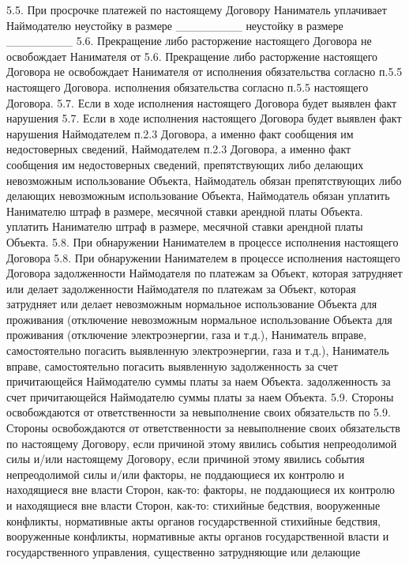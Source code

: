5.5. При просрочке платежей по настоящему Договору Наниматель уплачивает
Наймодателю
неустойку в размере ________%
неустойку в размере ________%
5.6. Прекращение либо расторжение настоящего Договора не освобождает Нанимателя
от
5.6. Прекращение либо расторжение настоящего Договора не освобождает Нанимателя
от
исполнения обязательства согласно п.5.5 настоящего Договора.
исполнения обязательства согласно п.5.5 настоящего Договора.
5.7. Если в ходе исполнения настоящего Договора будет выявлен факт нарушения
5.7. Если в ходе исполнения настоящего Договора будет выявлен факт нарушения
Наймодателем п.2.3 Договора, а именно факт сообщения им недостоверных сведений,
Наймодателем п.2.3 Договора, а именно факт сообщения им недостоверных сведений,
препятствующих либо делающих невозможным использование Объекта, Наймодатель
обязан
препятствующих либо делающих невозможным использование Объекта, Наймодатель
обязан
уплатить Нанимателю штраф в размере, месячной ставки арендной платы Объекта.
уплатить Нанимателю штраф в размере, месячной ставки арендной платы Объекта.
5.8. При обнаружении Нанимателем в процессе исполнения настоящего Договора
5.8. При обнаружении Нанимателем в процессе исполнения настоящего Договора
задолженности Наймодателя по платежам за Объект, которая затрудняет или делает
задолженности Наймодателя по платежам за Объект, которая затрудняет или делает
невозможным нормальное использование Объекта для проживания (отключение
невозможным нормальное использование Объекта для проживания (отключение
электроэнергии, газа и т.д.), Наниматель вправе, самостоятельно погасить
выявленную
электроэнергии, газа и т.д.), Наниматель вправе, самостоятельно погасить
выявленную
задолженность за счет причитающейся Наймодателю суммы платы за наем Объекта.
задолженность за счет причитающейся Наймодателю суммы платы за наем Объекта.
5.9. Стороны освобождаются от ответственности за невыполнение своих обязательств
по
5.9. Стороны освобождаются от ответственности за невыполнение своих обязательств
по
настоящему Договору, если причиной этому явились события непреодолимой силы
и/или
настоящему Договору, если причиной этому явились события непреодолимой силы
и/или
факторы, не поддающиеся их контролю и находящиеся вне власти Сторон, как-то:
факторы, не поддающиеся их контролю и находящиеся вне власти Сторон, как-то:
стихийные бедствия, вооруженные конфликты, нормативные акты органов
государственной
стихийные бедствия, вооруженные конфликты, нормативные акты органов
государственной
власти и государственного управления, существенно затрудняющие или делающие
